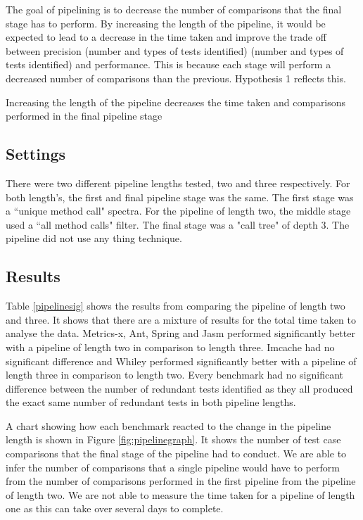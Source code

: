 The goal of pipelining is to decrease the number of comparisons that the final stage has to perform. By increasing the length of the pipeline, it would be expected to lead to a decrease in the time taken and improve the trade off between precision (number and types of tests identified)  (number and types of tests identified) and performance. This is because each stage will perform a decreased number of comparisons than the previous. Hypothesis 1 reflects this.

\begin{hyp}
Increasing the length of the pipeline decreases the time taken and comparisons performed in the final pipeline stage
\end{hyp}

\subsection{Settings}
There were two different pipeline lengths tested, two and three respectively. For both length's, the first and final pipeline stage was the same. The first stage was a ``unique method call" spectra. For the pipeline of length two, the middle stage used a ``all method calls" filter. The final stage was a "call tree" of depth 3. The pipeline did not use any thing technique.

\subsection{Results}

Table \ref{pipelinesig} shows the results from comparing the pipeline of length two and three. It shows that there are a mixture of results for the total time taken to analyse the data. Metrics-x, Ant, Spring and Jasm performed significantly better with a pipeline of length two in comparison to length three. Imcache had no significant difference and Whiley performed significantly better with a pipeline of length three in comparison to length two. Every benchmark had no significant difference between the number of redundant tests identified as they all produced the exact same number of redundant tests in both pipeline lengths.

A chart showing how each benchmark reacted to the change in the pipeline length is shown in Figure \ref{fig:pipelinegraph}. It shows the number of test case comparisons that the final stage of the pipeline had to conduct. We are able to infer the number of comparisons that a single pipeline would have to perform from the number of comparisons performed in the first pipeline from the pipeline of length two. We are not able to measure the time taken for a pipeline of length one as this can take over several days to complete.

